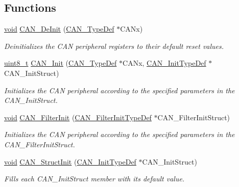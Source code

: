 \subsection*{Functions}
\begin{DoxyCompactItemize}
\item 
\hyperlink{usb__devapi_8h_afabf60e7f57651d6d595a02c75f07cd0}{void} \hyperlink{group___c_a_n___exported___functions_ga002b74cd69574a14b17ad445090245cd}{C\+A\+N\+\_\+\+De\+Init} (\hyperlink{struct_c_a_n___type_def}{C\+A\+N\+\_\+\+Type\+Def} $\ast$C\+A\+Nx)
\begin{DoxyCompactList}\small\item\em Deinitializes the C\+AN peripheral registers to their default reset values. \end{DoxyCompactList}\item 
\hyperlink{_p_e___types_8h_aba7bc1797add20fe3efdf37ced1182c5}{uint8\+\_\+t} \hyperlink{group___c_a_n___exported___functions_ga9023c35a9ab931ad4513fc5d19b4bd6c}{C\+A\+N\+\_\+\+Init} (\hyperlink{struct_c_a_n___type_def}{C\+A\+N\+\_\+\+Type\+Def} $\ast$C\+A\+Nx, \hyperlink{struct_c_a_n___init_type_def}{C\+A\+N\+\_\+\+Init\+Type\+Def} $\ast$C\+A\+N\+\_\+\+Init\+Struct)
\begin{DoxyCompactList}\small\item\em Initializes the C\+AN peripheral according to the specified parameters in the C\+A\+N\+\_\+\+Init\+Struct. \end{DoxyCompactList}\item 
\hyperlink{usb__devapi_8h_afabf60e7f57651d6d595a02c75f07cd0}{void} \hyperlink{group___c_a_n___exported___functions_ga39476830280340363c51041be6b12647}{C\+A\+N\+\_\+\+Filter\+Init} (\hyperlink{struct_c_a_n___filter_init_type_def}{C\+A\+N\+\_\+\+Filter\+Init\+Type\+Def} $\ast$C\+A\+N\+\_\+\+Filter\+Init\+Struct)
\begin{DoxyCompactList}\small\item\em Initializes the C\+AN peripheral according to the specified parameters in the C\+A\+N\+\_\+\+Filter\+Init\+Struct. \end{DoxyCompactList}\item 
\hyperlink{usb__devapi_8h_afabf60e7f57651d6d595a02c75f07cd0}{void} \hyperlink{group___c_a_n___exported___functions_gad77ad810868ed111755fc9e8ae0c7646}{C\+A\+N\+\_\+\+Struct\+Init} (\hyperlink{struct_c_a_n___init_type_def}{C\+A\+N\+\_\+\+Init\+Type\+Def} $\ast$C\+A\+N\+\_\+\+Init\+Struct)
\begin{DoxyCompactList}\small\item\em Fills each C\+A\+N\+\_\+\+Init\+Struct member with its default value. \end{DoxyCompactList}\item 

\end{DoxyCompactItemize}
